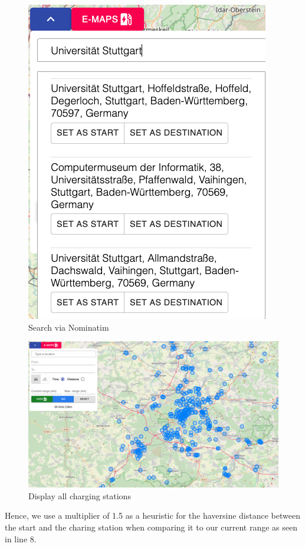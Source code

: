 \documentclass[a4paper]{article}
\begin{document}
\begin{figure}[h]
	\centering
	\includegraphics[scale=0.4]{figures/search}
	\caption{Search via Nominatim}
	\label{fig:search}
\end{figure}
\begin{figure}[h]
	\centering
	\includegraphics[scale=0.23]{figures/wide}
	\caption{Display all charging stations}
	\label{fig:charging}
\end{figure}
Hence, we use a multiplier of 1.5 as a heuristic for the haversine distance between the start and the charing station when comparing it to our current range as seen in line 8.
\end{document}
